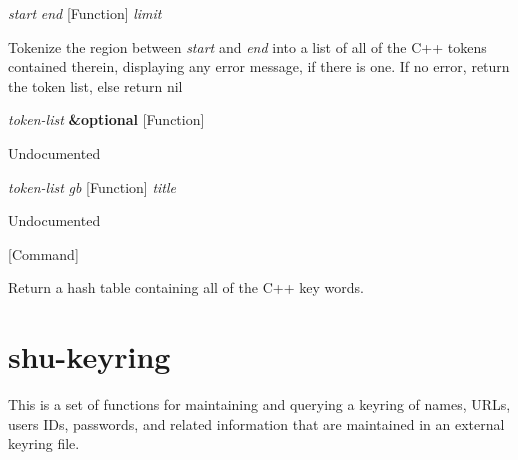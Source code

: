 \vspace{1em}
\noindent
{}
\usebox{\funcname}\emph{start} \emph{end}
 \hfill [Function]
\hspace*{\wd\funcname}\emph{limit}

\begin{doc-string}
Tokenize the region between \emph{start} and \emph{end} into a list of all of the C++
tokens contained therein, displaying any error message, if there is one.  If no
error, return the token list, else return nil
\end{doc-string}

\vspace{1em}
\noindent
{}
\usebox{\funcname}\emph{token-list} \textbf{\&optional}
 \hfill [Function]
\hspace*{\wd\funcname}

\begin{doc-string}
Undocumented
\end{doc-string}

\vspace{1em}
\noindent
{}
\usebox{\funcname}\emph{token-list} \emph{gb}
 \hfill [Function]
\hspace*{\wd\funcname}\emph{title}

\begin{doc-string}
Undocumented
\end{doc-string}

\vspace{1em}
\noindent
{}
\usebox{\funcname}
 \hfill [Command]

\begin{doc-string}
Return a hash table containing all of the C++ key words.
\end{doc-string}

\eject
\section{shu-keyring}


This is a set of functions for maintaining and querying a keyring of names,
URLs, users IDs, passwords, and related information that are maintained in an
external keyring file.

